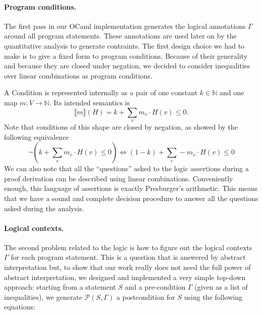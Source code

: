 \documentclass[nocopyrightspace,preprint]{sigplanconf}
\begin{document}
\paragraph{Program conditions.}
The first pass in our OCaml implementation generates the
logical annotations $\Gamma$ around all program statements.
These annotations are used later on by the quantitative
analysis to generate contraints.
%
The first design choice we had to make is to give a fixed form
to program conditions.  Because of their generality and because
they are closed under negation, we decided to consider
inequalities over linear combinations as program conditions.
A Condition is represented internally as a pair of one constant
$k \in \mathbb N$ and one map $m : V \rightarrow \mathbb N$.
Its intended semantics is
$$
\llbracket m \rrbracket(H) = k + \sum_v m_v \cdot H(v) \le 0.
$$
Note that conditions of this shape are closed by negation, as showed
by the following equivalence
$$
\neg (k + \sum_v m_v \cdot H(v) \le 0)
\Leftrightarrow (1-k) + \sum_v -m_v \cdot H(v) \le 0
$$
We can also note that all the ``questions'' asked to the logic
assertions during a proof derivation can be described using
linear combinations.  Conveniently enough, this language of
assertions is exactly Presburger's arithmetic.  This means that
we have a sound and complete decision procedure to answer
all the questions asked during the analysis.

\paragraph{Logical contexts.}
The second problem related to the logic is how to figure out
the logical contexts $\Gamma$ for each program statement.
This is a question that is answered by abstract interpretation
but, to show that our work really does not need the full power
of abstract interpretation, we designed and implemented a very
simple top-down approach: starting from a statement $S$ and
a pre-condition $\Gamma$ (given as a list of inequalities), we
generate $\mathcal P(S, \Gamma)$ a postcondition for $S$ using the
following equations:
\end{document}
